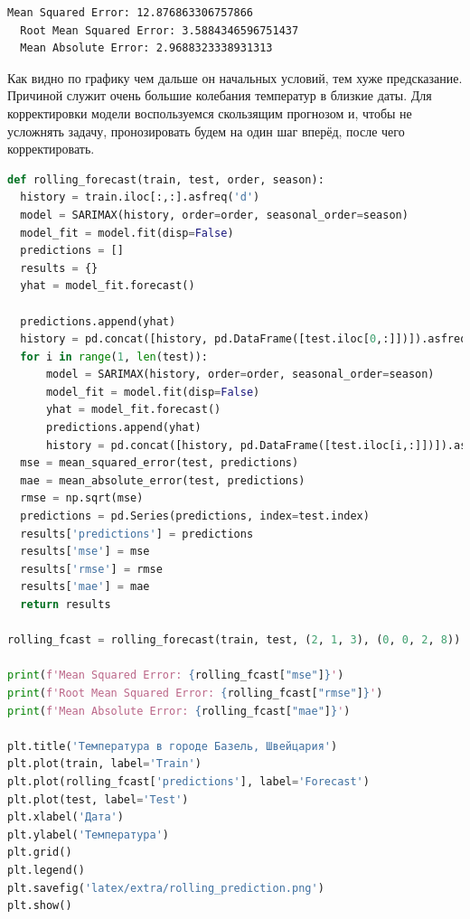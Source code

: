 \documentclass[a4paper, 12pt]{article}
\begin{document}
\begin{lstlisting}[style=text, caption=Отклонения результатов модели]
  Mean Squared Error: 12.876863306757866
  Root Mean Squared Error: 3.5884346596751437
  Mean Absolute Error: 2.9688323338931313
\end{lstlisting}
Как видно по графику чем дальше он начальных условий, тем хуже предсказание. Причиной служит очень большие колебания температур в близкие даты. Для корректировки модели воспользуемся скользящим прогнозом и, чтобы не усложнять задачу, пронозировать будем на один шаг вперёд, после чего корректировать.
\begin{lstlisting}[language=Python, caption=Использование скользящего прогноза]
  def rolling_forecast(train, test, order, season):
  history = train.iloc[:,:].asfreq('d')
  model = SARIMAX(history, order=order, seasonal_order=season)
  model_fit = model.fit(disp=False)
  predictions = []
  results = {}
  yhat = model_fit.forecast()

  predictions.append(yhat)
  history = pd.concat([history, pd.DataFrame([test.iloc[0,:]])]).asfreq('d')
  for i in range(1, len(test)):
      model = SARIMAX(history, order=order, seasonal_order=season)
      model_fit = model.fit(disp=False)
      yhat = model_fit.forecast()
      predictions.append(yhat)
      history = pd.concat([history, pd.DataFrame([test.iloc[i,:]])]).asfreq('d')
  mse = mean_squared_error(test, predictions)
  mae = mean_absolute_error(test, predictions)
  rmse = np.sqrt(mse)
  predictions = pd.Series(predictions, index=test.index)
  results['predictions'] = predictions
  results['mse'] = mse
  results['rmse'] = rmse
  results['mae'] = mae
  return results

rolling_fcast = rolling_forecast(train, test, (2, 1, 3), (0, 0, 2, 8))

print(f'Mean Squared Error: {rolling_fcast["mse"]}')
print(f'Root Mean Squared Error: {rolling_fcast["rmse"]}')
print(f'Mean Absolute Error: {rolling_fcast["mae"]}')

plt.title('Температура в городе Базель, Швейцария')
plt.plot(train, label='Train')
plt.plot(rolling_fcast['predictions'], label='Forecast')
plt.plot(test, label='Test')
plt.xlabel('Дата')
plt.ylabel('Температура')
plt.grid()
plt.legend()
plt.savefig('latex/extra/rolling_prediction.png')
plt.show()
\end{lstlisting}
\end{document}
